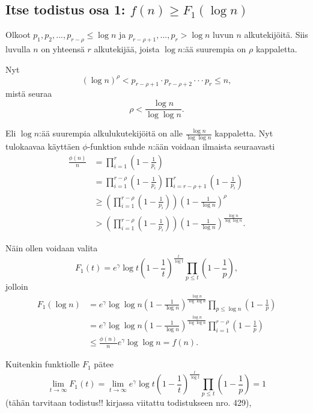 \documentclass{article}
\theoremstyle{definition}
\begin{document}
\subsection{Itse todistus osa 1: $f(n) \geq F_1(\log n)$}

Olkoot $p_1,p_2,...,p_{r-\rho} \leq \log n$ ja $p_{r-\rho+1},...,p_r > \log n$ luvun $n$ alkutekijöitä. Siis luvulla $n$ on yhteensä $r$ alkutekijää, joista $\log n$:ää suurempia on $\rho$ kappaletta.

Nyt
\begin{equation}
    (\log n)^\rho < p_{r-\rho+1} \cdot p_{r-\rho+2} \cdot \cdot \cdot p_r \leq n,
\end{equation}
mistä seuraa
\begin{equation}
    \rho < \frac{\log n}{\log\log n}.
\end{equation}

Eli $\log n$:ää suurempia alkulukutekijöitä on alle $\frac{\log n}{\log\log n}$ kappaletta.
Nyt tulokaavaa käyttäen $\phi$-funktion suhde $n$:ään voidaan ilmaista seuraavasti
\begin{align}
    \frac{\phi(n)}{n} & = \prod_{i=1}^r(1-\frac{1}{p_i})\\
    & = \prod_{i=1}^{r-\rho}(1-\frac{1}{p_i}) \prod_{i=r-\rho+1}^r(1-\frac{1}{p_i})\\
    & \geq \left(\prod_{i=1}^{r-\rho}(1-\frac{1}{p_i})\right) (1-\frac{1}{\log n})^\rho\\
    & > \left(\prod_{i=1}^{r-\rho}(1-\frac{1}{p_i})\right) (1-\frac{1}{\log n})^\frac{\log n}{\log \log n}.
\end{align}

Näin ollen voidaan valita
\begin{equation*}
    F_1(t)=e^\gamma \log t \left(1-\frac{1}{t}\right)^\frac{t}{\log t} \prod_{p\leq t} \left(1-\frac{1}{p}\right),
\end{equation*}
jolloin
\begin{align*}
    F_1(\log n) & = e^\gamma \log \log n \left(1-\frac{1}{\log n}\right)^\frac{\log n}{\log \log n} \prod_{p\leq \log n} \left(1-\frac{1}{p}\right)\\
    & = e^\gamma \log \log n \left(1-\frac{1}{\log n}\right)^\frac{\log n}{\log \log n} \prod_{i=1}^{r-\rho} \left(1-\frac{1}{p}\right)\\
    & \leq \frac{\phi(n)}{n} e^\gamma \log\log n = f(n).
\end{align*}

Kuitenkin funktiolle $F_1$ pätee
\begin{equation*}
    \lim_{t \rightarrow \infty} F_1(t) = \lim_{t \rightarrow \infty} e^\gamma \log t \left(1-\frac{1}{t}\right)^\frac{t}{\log t} \prod_{p\leq t} \left(1-\frac{1}{p}\right) = 1
\end{equation*}
(tähän tarvitaan todistus!! kirjassa viitattu todistukseen nro. 429),
\end{document}
